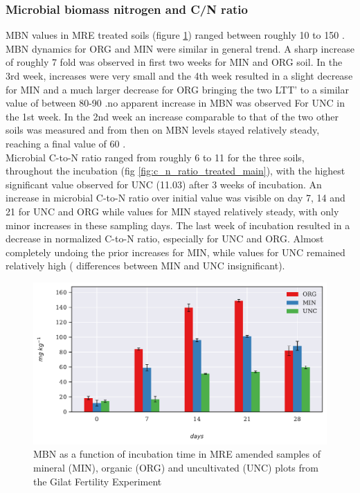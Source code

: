 		\subsubsection{Microbial biomass nitrogen and C/N ratio}
			MBN values in MRE treated soils (figure \ref{fig:mbn_treated_main}) ranged between roughly 10 to 150 \genericunit. MBN dynamics for ORG and MIN were similar in general trend. A sharp increase of roughly  7 fold was observed in first two weeks for MIN and ORG soil. In the 3rd week, increases were very small and the 4th week resulted in a slight decrease for MIN and a much larger decrease for ORG bringing the two LTT’ to a similar value of between 80-90 \genericunit.no apparent increase in MBN was observed For UNC in the 1st week. In the 2nd week an increase comparable to that of the two other soils was measured and from then on MBN levels stayed relatively steady, reaching a final value of 60 \genericunit.\\
			Microbial C-to-N ratio ranged from roughly 6 to 11 for the three soils,  throughout the incubation (fig \ref{fig:c_n_ratio_treated_main}), with the highest significant value observed for UNC (11.03) after 3 weeks of incubation.
			An increase in microbial C-to-N ratio over initial value was visible on day 7, 14 and 21 for UNC and ORG while values for MIN stayed relatively steady, with only minor increases in these sampling days. The last week of incubation resulted in a decrease in normalized C-to-N ratio,  especially for UNC and ORG. Almost completely undoing the prior increases for MIN, while values for UNC remained relatively high ( differences between MIN and UNC insignificant).

			\begin{figure}[H]
				\centering
				\includegraphics[scale=0.8, width=\linewidth]{thesis_figures/main_incubation/MRE_treated/MBN.pdf}
				\caption{MBN  as a function of incubation time in MRE amended samples of mineral (MIN), organic (ORG) and uncultivated (UNC) plots from the Gilat Fertility Experiment}
				\label{fig:mbn_treated_main}
			\end{figure}


